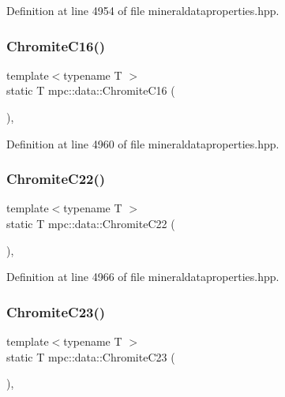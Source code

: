Definition at line 4954 of file mineraldataproperties.\+hpp.

\mbox{\label{namespacempc_1_1data_ae6c1a1548eee6581395044867777aeee}} 
\subsubsection{\texorpdfstring{Chromite\+C16()}{ChromiteC16()}}
{\footnotesize\ttfamily template$<$typename T $>$ \\
static T mpc\+::data\+::\+Chromite\+C16 (\begin{DoxyParamCaption}{ }\end{DoxyParamCaption})\hspace{0.3cm}{\ttfamily [inline]}, {\ttfamily [static]}}



Definition at line 4960 of file mineraldataproperties.\+hpp.

\mbox{\label{namespacempc_1_1data_a2c033c84843347ee5e6a36fc326abcec}} 
\subsubsection{\texorpdfstring{Chromite\+C22()}{ChromiteC22()}}
{\footnotesize\ttfamily template$<$typename T $>$ \\
static T mpc\+::data\+::\+Chromite\+C22 (\begin{DoxyParamCaption}{ }\end{DoxyParamCaption})\hspace{0.3cm}{\ttfamily [inline]}, {\ttfamily [static]}}



Definition at line 4966 of file mineraldataproperties.\+hpp.

\mbox{\label{namespacempc_1_1data_a4fdd18b16465a41024a5645aad65c25b}} 
\subsubsection{\texorpdfstring{Chromite\+C23()}{ChromiteC23()}}
{\footnotesize\ttfamily template$<$typename T $>$ \\
static T mpc\+::data\+::\+Chromite\+C23 (\begin{DoxyParamCaption}{ }\end{DoxyParamCaption})\hspace{0.3cm}{\ttfamily [inline]}, {\ttfamily [static]}}



